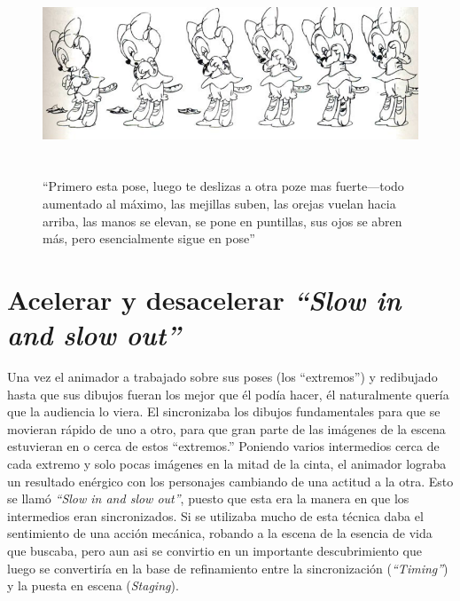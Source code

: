 \documentclass[a4paper,12pt]{report}
\begin{document}
\begin{enumerate}
 
    \begin{figure}[ht]
        \hspace*{-2cm}
        \includegraphics[height=6cm]{Imagenes/moving_hold}
        \caption{``Primero esta pose, luego te deslizas a otra poze mas fuerte---todo aumentado al máximo, las mejillas suben, las orejas vuelan hacia arriba, las manos se elevan, se pone en puntillas, sus ojos se abren más, pero esencialmente
        sigue en pose''}
        \label{fig:moving_hold}
    \end{figure}
 
\end{enumerate}
 
 
\section{Acelerar y desacelerar \textit{``Slow in and slow out''}}
 
 
Una vez el animador a trabajado sobre sus poses (los ``extremos'') y
redibujado hasta que sus dibujos fueran los mejor que él podía hacer,
él naturalmente quería que la audiencia lo viera.
El sincronizaba los dibujos fundamentales para que se movieran rápido de uno a otro,
para que gran parte de las imágenes de la escena estuvieran en o cerca de estos ``extremos.''
Poniendo varios intermedios cerca de cada extremo y solo pocas imágenes en la mitad de
la cinta, el animador lograba un resultado enérgico con los
personajes cambiando de una actitud a la otra. 
Esto se llamó \textit{``Slow in and slow out''}, 
puesto que esta era la manera en que los intermedios eran sincronizados.
Si se utilizaba mucho de esta técnica daba el sentimiento de una acción mecánica,
robando a la escena de la esencia de vida que buscaba, 
pero aun asi se convirtio en un importante descubrimiento que luego se convertiría en la base
de refinamiento entre la sincronización
(\textit{``Timing''}) y la puesta en escena (\textit{Staging}).\cite{principles_animation}
 
\end{document}
